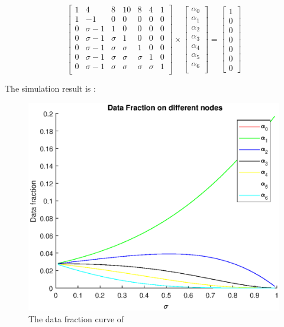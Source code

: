 \begin{equation}
{
\left[ \begin{array}{ccccccc}
1 & 4 & 8 & 10 & 8 & 4 & 1\\
1 & -1 & 0 & 0 & 0 & 0 & 0\\
0 & \sigma-1 & 1 & 0 & 0 & 0 & 0\\
0 & \sigma-1 & \sigma & 1 & 0 & 0 & 0\\
0 & \sigma-1 & \sigma & \sigma & 1 & 0 & 0\\
0 & \sigma-1 & \sigma & \sigma & \sigma & 1 & 0\\
0 & \sigma-1 & \sigma & \sigma & \sigma & \sigma & 1\\

\end{array} 
\right ]} \times \left[ \begin{array}{c}
\alpha_{0} \\
\alpha_{1} \\
\alpha_{2} \\
\alpha_{3} \\
\alpha_{4}\\
\alpha_{5}\\
\alpha_{6}\\
\end{array} 
\right ] = \left[ \begin{array}{c}
1 \\
0 \\
0 \\
0 \\
0\\
0\\
0
\end{array} 
\right ]
\end{equation}
\newpage

The simulation result is :

\begin{figure}[!ht]
\centering
\includegraphics[width=1\columnwidth]{figure/rtfraction.eps}
\caption{The data fraction curve of }
\label{fig:rtfraction}
\end{figure}

